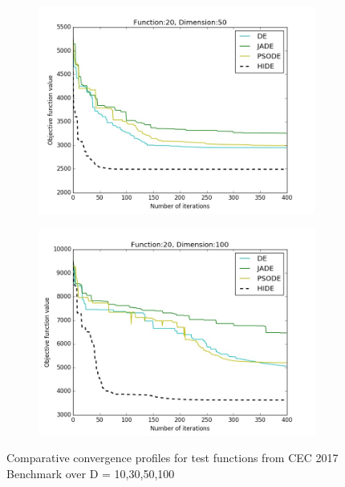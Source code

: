\documentclass[a4paper,twoside]{article}
\begin{document}
\begin{figure}[h!]
\begin{subfigure}[b]{0.24\textwidth}
        \includegraphics[width=\textwidth,natwidth=800,natheight=600]{plot_50D_F20_save}
        \caption{}
    \end{subfigure}
    \begin{subfigure}[b]{0.24\textwidth}
        \includegraphics[width=\textwidth,natwidth=800,natheight=600]{plot_100D_F20_save}
        \caption{}
    \end{subfigure}

    \caption{Comparative convergence profiles for test functions from CEC 2017 Benchmark over D = 10,30,50,100}
    \vspace{-4mm}
\end{figure}
\end{document}

